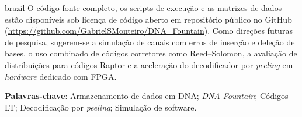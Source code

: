 \begin{resumo}
\begin{otherlanguage*}{brazil}
O código-fonte completo, os scripts de execução e as matrizes de dados estão disponíveis sob licença de código aberto em repositório público no GitHub (\url{https://github.com/GabrielSMonteiro/DNA_Fountain}). Como direções futuras de pesquisa, sugerem-se a simulação de canais com erros de inserção e deleção de bases, o uso combinado de códigos corretores como Reed--Solomon, a avaliação de distribuições para códigos Raptor e a aceleração do decodificador por \emph{peeling} em \emph{hardware} dedicado com FPGA.

\vspace{0.5cm}
\textbf{Palavras-chave}: Armazenamento de dados em DNA; \emph{DNA Fountain}; Códigos LT; Decodificação por \emph{peeling}; Simulação de software.

\end{otherlanguage*}
\end{resumo}
